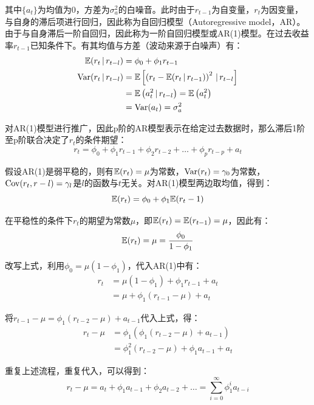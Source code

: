 \documentclass[11pt]{article}
\begin{document}
其中$\{a_t\}$为均值为0，方差为$\sigma_{a}^2$的白噪音。此时由于$r_{t-1}$为自变量，$r_t$为因变量，与自身的滞后项进行回归，因此称为自回归模型（Autoregressive model，AR）。由于与自身滞后一阶自回归，因此称为一阶自回归模型或AR(1)模型。在过去收益率$r_{t-1}$已知条件下。有其均值与方差（波动来源于白噪声）有：
\begin{align*}
    \mathbb{E}(r_t \,\vert\, r_{t-l}) &= \phi_0 + \phi_1 r_{t-1} \\
    \operatorname{Var}(r_t \,\vert\, r_{t-l}) &= \mathbb{E}\left[\left(r_t - \mathbb{E}(r_t \,\vert\, r_{t-1}) \right)^2 \,\vert\, r_{t-l} \right] \\
    &= \mathbb{E} \left(a_t^2 \,\vert\, r_{t-l} \right) = \mathbb{E} \left(a_t^2\right) \\
    &= \operatorname{Var}(a_t) = \sigma_{a}^{2}
\end{align*}

对AR(1)模型进行推广，因此p阶的AR模型表示在给定过去数据时，那么滞后1阶至p阶联合决定了$r_t$的条件期望：
\begin{equation*}
    r_t = \phi_0 + \phi_1 r_{t-1} +  \phi_2 r_{t-2} + \dots +  \phi_p r_{t-p}  + a_t
\end{equation*}

假设AR(1)是弱平稳的，则有$\mathbb{E}(r_t)=\mu$为常数，$\operatorname{Var}(r_t)=\gamma_0$为常数，$\operatorname{Cov}(r_t,r-l) = \gamma_l$是$l$的函数与$t$无关。对AR(1)模型两边取均值，得到：
\begin{equation*}
    \mathbb{E}(r_t) = \phi_0 + \phi_1 \mathbb{E}(r_t-1)
\end{equation*}

在平稳性的条件下$r_t$的期望为常数$\mu$，即$\mathbb{E}(r_t) = \mathbb{E}(r_{t-1}) = \mu$，因此有：
\begin{equation*}
    \mathbb{E}(r_t) = \mu = \frac{\phi_0}{1-\phi_1}
\end{equation*}

改写上式，利用$\phi_0 = \mu(1-\phi_1)$，代入AR(1)中有：
\begin{align*}
    r_t &= \mu(1-\phi_1) + \phi_1 r_{t-1} + a_t \\
    &= \mu + \phi_1 (r_{t-1}-\mu)+ a_t 
\end{align*}

将$r_{t-1} - \mu = \phi_1 (r_{t-2}-\mu)+ a_{t-1}$代入上式，得：
\begin{align*}
    r_t - \mu &= \phi_1 \left(\phi_1 (r_{t-2}-\mu)+ a_{t-1} \right) \\
    &= \phi_1^2 (r_{t-2}-\mu)+ \phi_1 a_{t-1} + a_t
\end{align*}

重复上述流程，重复代入，可以得到：
\begin{equation*}
    r_t - \mu = a_t + \phi_1 a_{t-1} + \phi_2 a_{t-2} + \dots = \sum_{i=0}^{\infty} \phi_{1}^{i} a_{t-i}
\end{equation*}
\end{document}
